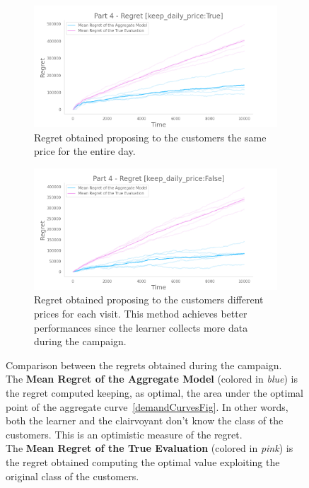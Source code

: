 \begin{figure}[!htb]
    \centering

    \begin{subfigure}[!H]{0.8\textwidth}
        \centering
        \includegraphics[width=\textwidth]{images/part4_keep-daily-priceTrue.png}
        \caption{Regret obtained proposing to the customers the same price for the entire day.}
    \end{subfigure}
    \begin{subfigure}[!H]{0.8\textwidth}
        \centering
        \includegraphics[width=\textwidth]{images/part4_keep-daily-priceFalse.png}
        \caption{Regret obtained proposing to the customers different prices for each visit. This method achieves better performances since the learner collects more data during the campaign.}
    \end{subfigure}

    \caption{Comparison between the regrets obtained during the campaign.\\
    The \textbf{Mean Regret of the Aggregate Model} (colored in \textit{blue}) is the regret computed keeping, as optimal, the area under the optimal point of the aggregate curve~\ref{demandCurvesFig}. In other words, both the learner and the clairvoyant don't know the class of the customers. This is an optimistic measure of the regret.\\
    The \textbf{Mean Regret of the True Evaluation} (colored in \textit{pink}) is the regret obtained computing the optimal value exploiting the original class of the customers.}
    \label{regret4Fig}
\end{figure}